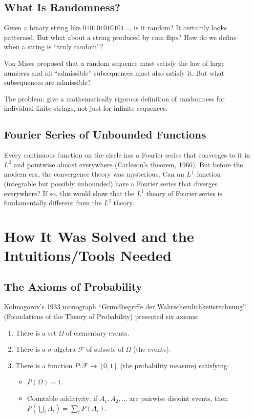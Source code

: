 \subsection{What Is Randomness?}

Given a binary string like $010101010101\dots$, is it random? It certainly looks patterned. But what about a string produced by coin flips? How do we define when a string is ``truly random''?

Von Mises proposed that a random sequence must satisfy the law of large numbers and all ``admissible'' subsequences must also satisfy it. But what subsequences are admissible?

The problem: give a mathematically rigorous definition of randomness for individual finite strings, not just for infinite sequences.

\subsection{Fourier Series of Unbounded Functions}

Every continuous function on the circle has a Fourier series that converges to it in $L^2$ and pointwise almost everywhere (Carleson's theorem, 1966). But before the modern era, the convergence theory was mysterious. Can an $L^1$ function (integrable but possibly unbounded) have a Fourier series that diverges everywhere? If so, this would show that the $L^1$ theory of Fourier series is fundamentally different from the $L^2$ theory.

\section{How It Was Solved and the Intuitions/Tools Needed}

\subsection{The Axioms of Probability}

Kolmogorov's 1933 monograph ``Grundbegriffe der Wahrscheinlichkeitsrechnung'' (Foundations of the Theory of Probability) presented six axioms:

\begin{enumerate}
    \item There is a set $\Omega$ of elementary events.
    \item There is a $\sigma$-algebra $\mathcal{F}$ of subsets of $\Omega$ (the events).
    \item There is a function $P: \mathcal{F} \to [0,1]$ (the probability measure) satisfying:
    \begin{itemize}
        \item $P(\Omega) = 1$.
        \item Countable additivity: if $A_1, A_2, \dots$ are pairwise disjoint events, then $P(\bigcup_i A_i) = \sum_i P(A_i)$.
    \end{itemize}
\end{enumerate}

